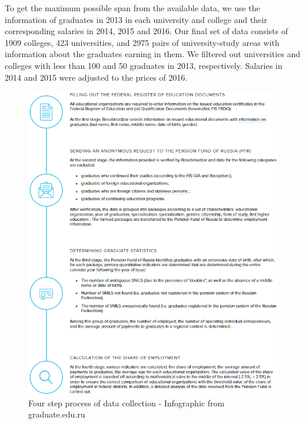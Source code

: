 \documentclass[alpha-refs]{wiley-article-05g}
\begin{document}
\vspace{0.5em}

To get the maximum possible span from the available data,  we use the information of graduates in 2013 in each university and college and their corresponding salaries in 2014, 2015 and 2016. Our final set of data consists of 1909 colleges, 423 universities, and 2975 pairs of university-study areas with information about the graduates earning in them. We filtered out universities and colleges with less than 100 and 50 graduates in 2013, respectively. Salaries in 2014 and 2015 were adjusted to the prices of 2016. 

\begin{center}
	\begin{figure}[htbp!]
\begin{minipage}[b]{1\linewidth}
			\centering
			\hspace*{-0.2in}
         \includegraphics[scale=0.88, frame]{gedu_cap1b.png}
		\end{minipage}
			\caption{Four step process of data collection - Infographic from graduate.edu.ru}\label{fig:1.1}
	\end{figure}
\end{center}
\end{document}
